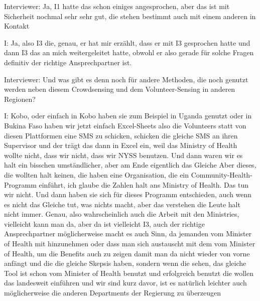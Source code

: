 Interviewer: Ja, I1 hatte das schon einiges angesprochen, aber das ist mit Sicherheit nochmal sehr sehr gut, die stehen bestimmt auch mit einem anderen in Kontakt 

I: Ja, also I3 die, genau, er hat mir erz{\"a}hlt, dass er mit I3 gesprochen hatte und dann I3 das an mich weitergeleitet hatte, obwohl er also gerade f{\"u}r solche Fragen definitiv der richtige Ansprechpartner ist.

Interviewer: Und was gibt es denn noch f{\"u}r andere Methoden, die noch genutzt werden neben diesem Crowdsensing und dem Volunteer-Sensing in anderen Regionen? 

I: Kobo, oder einfach in Kobo haben sie zum Beispiel in Uganda genutzt oder in Bukina Faso haben wir jetzt einfach Excel-Sheets also die Volunteers statt von diesen Plattformen eine SMS zu schicken, schicken die gleiche SMS an ihren Supervisor und der tr{\"a}gt das dann in Excel ein, weil das Ministry of Health wollte nicht, dass wir nicht, dass wir NYSS benutzen. Und dann waren wir es halt ein bisschen umst{\"a}ndlicher, aber am Ende eigentlich das Gleiche Aber dieses, die wollten halt keinen, die haben eine Organisation, die ein Community-Health-Programm einf{\"u}hrt, ich glaube die Zahlen halt ans Ministry of Health. Das tun wir nicht. Und dann haben sie sich f{\"u}r dieses Programm entschieden, auch wenn es nicht das Gleiche tut, was nichts macht, aber das verstehen die Leute halt nicht immer. Genau, also wahrscheinlich auch die Arbeit mit den Ministries, vielleicht kann man da, aber da ist vielleicht I3, auch der richtige Ansprechpartner m{\"o}glicherweise macht es auch Sinn, da jemanden vom Minister of Health mit hinzunehmen oder dass man sich austauscht mit dem vom Minister of Health, um die Benefits auch zu zeigen damit man da nicht wieder von vorne anf{\"a}ngt und die die gleiche Skepsis haben, sondern wenn die sehen, das gleiche Tool ist schon vom Minister of Health benutzt und erfolgreich benutzt die wollen das landesweit einf{\"u}hren und wir sind kurz davor, ist es nat{\"u}rlich leichter auch m{\"o}glicherweise die anderen Departments der Regierung zu {\"u}berzeugen 

